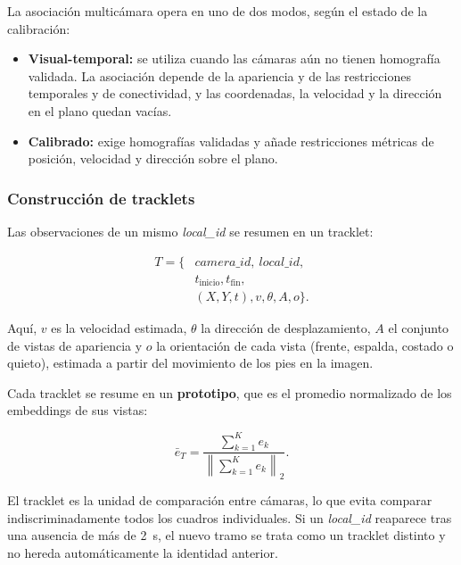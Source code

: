 \documentclass[12pt,letterpaper]{article}
\begin{document}
La asociación multicámara opera en uno de dos modos, según el estado de
la calibración:

\begin{itemize}
    \item \textbf{Visual-temporal:} se utiliza cuando las cámaras aún no
    tienen homografía validada. La asociación depende de la apariencia y
    de las restricciones temporales y de conectividad, y las
    coordenadas, la velocidad y la dirección en el plano quedan vacías.
    \item \textbf{Calibrado:} exige homografías validadas y añade
    restricciones métricas de posición, velocidad y dirección sobre el
    plano.
\end{itemize}

\subsubsection{Construcción de tracklets}

Las observaciones de un mismo \textit{local\_id} se resumen en un
tracklet:

\begin{equation}
\begin{aligned}
T=\{&
camera\_id,\ local\_id,\\
&t_{\text{inicio}},t_{\text{fin}},\\
&(X,Y,t),v,\theta,A,o
\}.
\end{aligned}
\end{equation}

Aquí, $v$ es la velocidad estimada, $\theta$ la dirección de
desplazamiento, $A$ el conjunto de vistas de apariencia y $o$ la
orientación de cada vista (frente, espalda, costado o quieto), estimada a
partir del movimiento de los pies en la imagen.

Cada tracklet se resume en un \textbf{prototipo}, que es el promedio
normalizado de los embeddings de sus vistas:

\begin{equation}
\bar{e}_T=
\frac{\sum_{k=1}^{K} e_k}
{\left\|\sum_{k=1}^{K} e_k\right\|_2}.
\end{equation}

El tracklet es la unidad de comparación entre cámaras, lo que evita
comparar indiscriminadamente todos los cuadros individuales. Si un
\textit{local\_id} reaparece tras una ausencia de más de 2~s, el nuevo
tramo se trata como un tracklet distinto y no hereda automáticamente la
identidad anterior.
\end{document}
